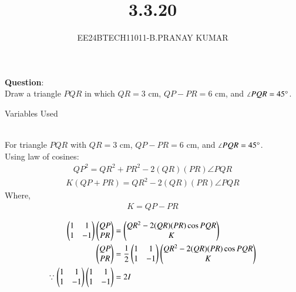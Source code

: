 \documentclass[journal]{IEEEtran}
\begin{document}

\vspace{3cm}

\title{3.3.20}
\author{EE24BTECH11011-B.PRANAY KUMAR
}
 \maketitle
{\let\newpage\relax\maketitle}

\renewcommand{\thefigure}{\theenumi}
\renewcommand{\thetable}{\theenumi}
\setlength{\intextsep}{10pt} %


\renewcommand{\thetable}{\theenumi}



\textbf{Question}:\\
Draw a triangle $PQR$ in which $QR = 3$ cm, $QP - PR = 6$ cm, and $\angle PQR = 45\degree$.\\

\solution
\begin{table}[h!]    
  \centering
  
  \caption{Variables Used}
  \label{tab1-1.4-9o}
\end{table}\\

For triangle $PQR$ with $QR = 3$ cm, $QP - PR = 6$ cm, and $\angle PQR = 45\degree$.\\
Using law of cosines:
\begin{align}
    QP^2 = QR^2 + PR^2 - 2(QR) (PR) \angle PQR 
\end{align}
\begin{align}
    K (QP+PR) = QR^2 - 2 (QR) (PR) \angle PQR 
\end{align}
Where,
\begin{align}
    K = QP-PR
\end{align}

\begin{align}
    \begin{pmatrix}1 & 1 \\ 1 & -1\end{pmatrix} \begin{pmatrix}QP\\ PR\end{pmatrix} &= \begin{pmatrix}QR^2 - 2(QR)(PR) \cos PQR \\ K\end{pmatrix} \\
    \begin{pmatrix}QP \\ PR\end{pmatrix} &= \frac{1}{2} \begin{pmatrix}1 & 1 \\ 1 & -1\end{pmatrix} \begin{pmatrix}QR^2 - 2(QR)(PR) \cos PQR \\ K\end{pmatrix} \\
    \because \begin{pmatrix}1 & 1 \\ 1 & -1\end{pmatrix} \begin{pmatrix}1 & 1 \\ 1 & -1\end{pmatrix} &= 2I
\end{align}
\end{document}
